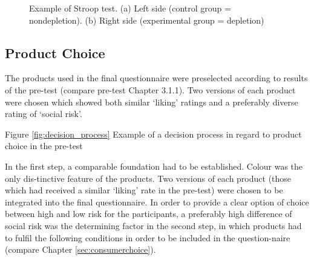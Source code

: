 \begin{figure}[h!]
  \begin{center}
    \caption{Example of Stroop test. (a) Left side (control group = nondepletion). (b) Right side (experimental group = depletion)}\label{fig:green_vs_pink}
  \end{center}
\end{figure}

\subsection{Product Choice}
The products used in the final questionnaire were preselected according to results of the pre-test (compare pre-test Chapter 3.1.1). Two versions of each product were chosen which showed both similar ‘liking’ ratings and a preferably diverse rating of ‘social risk’. \par
Figure \ref{fig:decision_process} Example of a decision process in regard to product choice in the pre-test \par
In the first step, a comparable foundation had to be established. Colour was the only dis-tinctive feature of the products. Two versions of each product (those which had received a similar  ‘liking’ rate in the pre-test) were chosen to be integrated into the final questionnaire. In order to provide a clear option of choice between high and low risk for the participants, a preferably high difference of social risk was the determining factor in the second step, in which products had to fulfil the following conditions in order to be included in the question-naire (compare Chapter \ref{sec:consumerchoice}).\par

